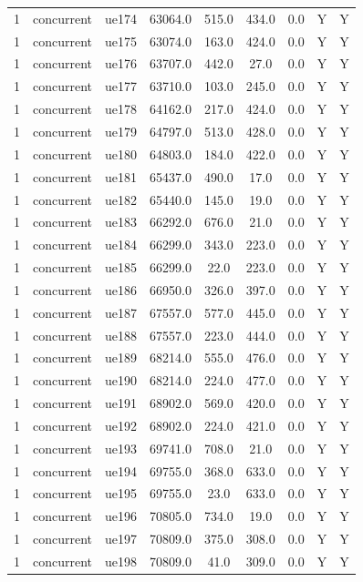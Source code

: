 \begin{table}[ht]
\begin{tabular}{|c|c|c|c|c|c|c|c|c|}
1 & concurrent & ue174 & 63064.0 & 515.0 & 434.0 & 0.0 & Y & Y \\
1 & concurrent & ue175 & 63074.0 & 163.0 & 424.0 & 0.0 & Y & Y \\
1 & concurrent & ue176 & 63707.0 & 442.0 & 27.0 & 0.0 & Y & Y \\
1 & concurrent & ue177 & 63710.0 & 103.0 & 245.0 & 0.0 & Y & Y \\
1 & concurrent & ue178 & 64162.0 & 217.0 & 424.0 & 0.0 & Y & Y \\
1 & concurrent & ue179 & 64797.0 & 513.0 & 428.0 & 0.0 & Y & Y \\
1 & concurrent & ue180 & 64803.0 & 184.0 & 422.0 & 0.0 & Y & Y \\
1 & concurrent & ue181 & 65437.0 & 490.0 & 17.0 & 0.0 & Y & Y \\
1 & concurrent & ue182 & 65440.0 & 145.0 & 19.0 & 0.0 & Y & Y \\
1 & concurrent & ue183 & 66292.0 & 676.0 & 21.0 & 0.0 & Y & Y \\
1 & concurrent & ue184 & 66299.0 & 343.0 & 223.0 & 0.0 & Y & Y \\
1 & concurrent & ue185 & 66299.0 & 22.0 & 223.0 & 0.0 & Y & Y \\
1 & concurrent & ue186 & 66950.0 & 326.0 & 397.0 & 0.0 & Y & Y \\
1 & concurrent & ue187 & 67557.0 & 577.0 & 445.0 & 0.0 & Y & Y \\
1 & concurrent & ue188 & 67557.0 & 223.0 & 444.0 & 0.0 & Y & Y \\
1 & concurrent & ue189 & 68214.0 & 555.0 & 476.0 & 0.0 & Y & Y \\
1 & concurrent & ue190 & 68214.0 & 224.0 & 477.0 & 0.0 & Y & Y \\
1 & concurrent & ue191 & 68902.0 & 569.0 & 420.0 & 0.0 & Y & Y \\
1 & concurrent & ue192 & 68902.0 & 224.0 & 421.0 & 0.0 & Y & Y \\
1 & concurrent & ue193 & 69741.0 & 708.0 & 21.0 & 0.0 & Y & Y \\
1 & concurrent & ue194 & 69755.0 & 368.0 & 633.0 & 0.0 & Y & Y \\
1 & concurrent & ue195 & 69755.0 & 23.0 & 633.0 & 0.0 & Y & Y \\
1 & concurrent & ue196 & 70805.0 & 734.0 & 19.0 & 0.0 & Y & Y \\
1 & concurrent & ue197 & 70809.0 & 375.0 & 308.0 & 0.0 & Y & Y \\
1 & concurrent & ue198 & 70809.0 & 41.0 & 309.0 & 0.0 & Y & Y \\

\end{tabular}
\end{table}
